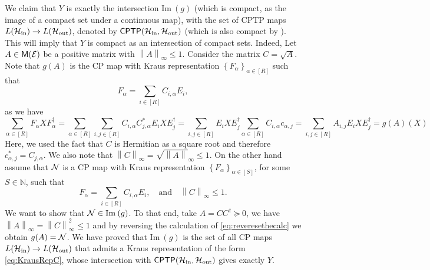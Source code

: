 \documentclass[10pt]{article}
\newcommand{\SIN}{\mathrm{in}}
\newcommand{\SOUT}{\mathrm{out}}
\newcommand{\ima}{\mathrm{Im}\:}
\newcommand{\N}{\mathbb{N}}
\newcommand{\ppp}[1]{\left\{#1\right\}}
\newcommand{\norm}[1]{\left\|#1\right\|}
\newcommand{\s}[1]{\mathsf{#1}}
\begin{document}
    We claim that $Y$ is exactly the intersection $\ima(g)$ (which is compact, as the image of a compact set under a continuous map), with the set of CPTP maps $L(\calH_{\SIN})\to L(\calH_{\SOUT})$, denoted by $\s{CPTP}(\calH_{\SIN},\calH_{\SOUT})$  (which is also compact by \cite[Proposition 2.28]{watrous2018theory}). This  will imply that $Y$ is compact as an intersection of compact sets. Indeed, Let $A\in \s{M}(\calE)$ be a positive matrix with $\norm{A}_{\infty}\leq 1$. Consider the matrix $C=\sqrt{A}$. Note that $g(A)$ is the CP map with Kraus representation $\ppp{F_\alpha}_{\alpha\in [R]}$ such that 
    \[F_{\alpha}=\sum_{i\in [R]}C_{i,\alpha}E_i, \]
    as we have
    \begin{equation}
        \sum_{\alpha\in [R]}F_{\alpha} X F_{\alpha}^\dag= \sum_{\alpha\in [R]}\sum_{i,j\in [R]} C_{i,\alpha} C_{j,\alpha}^* E_i X E_{j}^\dag= \sum_{i,j\in [R]} E_i X E_{j}^\dag\sum_{\alpha\in [R]}  C_{i,\alpha} c_{\alpha,j}=\sum_{i,j\in [R]} A_{i,j }E_i X E_{j}^\dag=g(A)(X)\label{eq:reveresethecalc}
    \end{equation}
    Here, we used the fact that  $C$ is Hermitian as a square root and therefore $c_{\alpha,j}^*=C_{j,\alpha}$. We also note that $\norm{C}_{\infty}=\sqrt{\norm{A}}_{\infty}\leq 1$. On the other hand assume that ${\cal N}$ is a CP map with Kraus representation $\ppp{F_{\alpha}}_{\alpha\in [S]}$, for some $S\in \N$, such that 
     \begin{equation}
         F_{\alpha}=\sum_{i\in [R]}C_{i,\alpha}E_i, \quad \text{and}\quad \norm{C}_{\infty}\leq 1.\label{eq:KrausRepC}
     \end{equation}
     We want to show that $\calN\in \ima(g)$. To that end, take $A=CC^\dag \succeq 0$, we have $\norm{A}_\infty=\norm{C}_\infty^2\leq 1$ and by reversing the calculation of \eqref{eq:reveresethecalc} we obtain $g(A)={\cal N}$. We have proved that $\ima(g)$ is the set of all CP maps $L(\calH_{\SIN})\to L(\calH_{\SOUT})$ that admits a Kraus representation of the form \eqref{eq:KrausRepC}, whose intersection with $\s{CPTP}(\calH_{\SIN},\calH_{\SOUT})$ gives exactly $Y$.
    

  
    





\end{document}
